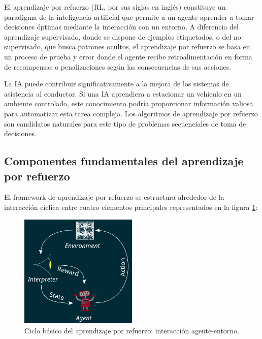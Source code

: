 
El aprendizaje por refuerzo (RL, por sus siglas en inglés) constituye un paradigma de la inteligencia artificial
que permite a un agente aprender a tomar decisiones óptimas mediante la interacción con un entorno.
A diferencia del aprendizaje supervisado, donde se dispone de ejemplos etiquetados, o del no supervisado,
que busca patrones ocultos, el aprendizaje por refuerzo se basa en un proceso de prueba y error donde el agente
recibe retroalimentación en forma de recompensas o penalizaciones según las consecuencias de sus acciones.


La IA puede contribuir significativamente a la mejora de los sistemas de asistencia al conductor.
Si una IA aprendiera a estacionar un vehículo en un ambiente controlado, este conocimiento podría
proporcionar información valiosa para automatizar esta tarea compleja. Los algoritmos de aprendizaje
por refuerzo son candidatos naturales para este tipo de problemas secuenciales de toma de decisiones.

\subsection{Componentes fundamentales del aprendizaje por refuerzo}\label{subsec:rl-components}

El framework de aprendizaje por refuerzo se estructura alrededor de la interacción cíclica entre
cuatro elementos principales representados en la figura \ref{fig:rl-cycle}:

\begin{figure}[!ht]
    \centering
    \includegraphics[width=0.5\textwidth]{img/2-mt/RL.png}
    \caption{Ciclo básico del aprendizaje por refuerzo: interacción agente-entorno.}
    \label{fig:rl-cycle}
\end{figure}

